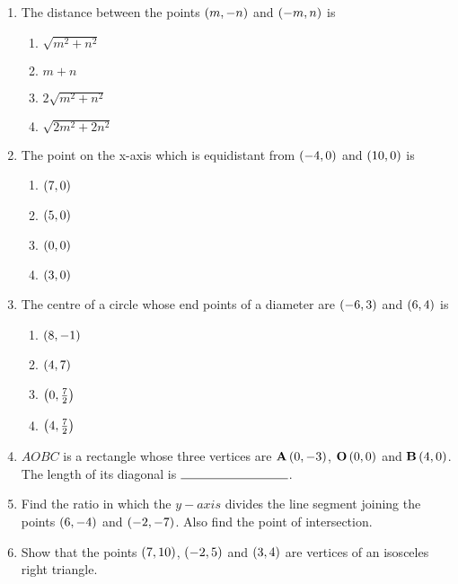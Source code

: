 \begin{enumerate}
\item The distance between the points $\left(m,-n\right)$ and $\left(-m, n\right)$ is
\begin{enumerate}
\item $\sqrt{m^{2} + n^{2}}$
\item $ m+n $
\item $ 2\sqrt{m^{2} + n^{2}}$
\item $\sqrt{2m^{2} + 2n^{2}}$
\end{enumerate}
\item The point on the x-axis which is equidistant from $\left(-4,0\right)$ and $\left(10,0\right)$ is
\begin{enumerate}             
\item $\left(7,0\right)$
\item $\left(5,0\right)$              
\item $\left(0,0\right)$
\item $\left(3,0\right)$
\end{enumerate}
\item The centre of a circle whose end points of a diameter are $\left(-6,3\right)$ and $\left(6,4\right)$ is
\begin{enumerate}
\item $\left(8,-1\right)$
\item $\left(4,7\right)$
\item $\left(0,\frac{7}{2}\right)$
\item $\left(4,\frac{7}{2}\right)$
\end{enumerate}
\item $AOBC$ is a rectangle whose three vertices are $\mathbf{A}\left(0,-3\right)$, $\mathbf{O}\left(0,0\right)$ and $\mathbf{B}\left(4,0\right)$. The length of its diagonal is $\rule{3cm}{0.15mm}$.
\item Find the ratio in which the $y-axis$ divides the line segment joining the points $\left(6,-4\right)$ and $\left(-2, -7\right)$. Also find the point of intersection.
\item Show that the points $\left(7, 10\right)$, $\left(-2, 5\right)$ and $\left(3, 4\right)$ are vertices of an isosceles right triangle.
\end{enumerate}
